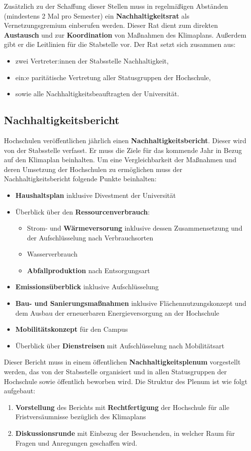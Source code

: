\documentclass[DIV=calc]{scrartcl}
\begin{document}
Zusätzlich zu der Schaffung dieser Stellen muss in regelmäßigen Abständen (mindestens 2 Mal pro Semester) ein \textbf{Nachhaltigkeitsrat} als Vernetzungsgremium einberufen werden. Dieser Rat dient zum direkten \textbf{Austausch} und zur \textbf{Koordination} von Maßnahmen des Klimaplans. Außerdem gibt er die Leitlinien für die Stabstelle vor. Der Rat setzt sich zusammen aus:
\begin{itemize}
    \item zwei Vertreter:innen der Stabsstelle Nachhaltigkeit, 
    \item ein:e paritätische Vertretung aller Statusgruppen der Hochschule,
    \item sowie alle Nachhaltigkeitsbeauftragten der Universität.
\end{itemize}
\subsection*{Nachhaltigkeitsbericht}
Hochschulen veröffentlichen jährlich einen \textbf{Nachhaltigkeitsbericht}. Dieser wird von der Stabsstelle verfasst. Er muss die Ziele für das kommende Jahr in Bezug auf den Klimaplan beinhalten. Um eine Vergleichbarkeit der Maßnahmen und deren Umsetzung der Hochschulen zu ermöglichen muss der Nachhaltigkeitsbericht folgende Punkte beinhalten:
\begin{itemize}
    \item \textbf{Haushaltsplan} inklusive Divestment der Universität
\item  Überblick über den \textbf{Ressourcenverbrauch}:
    \begin{itemize}
        \item Strom- und \textbf{Wärmeversorung} inklusive dessen Zusammensetzung und der Aufschlüsselung nach Verbrauchsorten
        \item Wasserverbrauch
        \item \textbf{Abfallproduktion} nach Entsorgungsart
    \end{itemize}
\item \textbf{Emissionsüberblick} inklusive Aufschlüsselung
\item \textbf{Bau- und Sanierungsmaßnahmen} inklusive Flächennutzungskonzept und dem Ausbau der erneuerbaren Energieversorgung an der Hochschule
\item \textbf{Mobilitätskonzept} für den Campus
\item Überblick über \textbf{Dienstreisen} mit Aufschlüsselung nach Mobilitätsart
\end{itemize}
Dieser Bericht muss in einem öffentlichen \textbf{Nachhaltigkeitsplenum} vorgestellt werden, das von der Stabsstelle organisiert und in allen Statusgruppen der Hochschule sowie öffentlich beworben wird. Die Struktur des Plenum ist wie folgt aufgebaut: 
\begin{enumerate}
    \item \textbf{Vorstellung} des Berichts mit \textbf{Rechtfertigung} der Hochschule für alle Fristversäumnisse bezüglich des Klimaplans
    \item \textbf{Diskussionsrunde} mit Einbezug der Besuchenden, in welcher Raum für Fragen und Anregungen geschaffen wird.
\end{enumerate}
\end{document}
